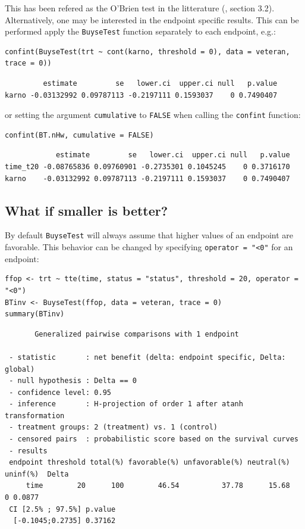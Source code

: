 \documentclass[12pt]{article}
\begin{document}
This has been refered as the O’Brien test in the litterature
(\cite{verbeeck2019generalized}, section 3.2). Alternatively, one may be
interested in the endpoint specific results. This can be performed
apply the \texttt{BuyseTest} function separately to each endpoint, e.g.:
\lstset{language=r,label= ,caption= ,captionpos=b,numbers=none}
\begin{lstlisting}
confint(BuyseTest(trt ~ cont(karno, threshold = 0), data = veteran, trace = 0))
\end{lstlisting}

\begin{verbatim}
         estimate         se   lower.ci  upper.ci null   p.value
karno -0.03132992 0.09787113 -0.2197111 0.1593037    0 0.7490407
\end{verbatim}


or setting the argument \texttt{cumulative} to \texttt{FALSE} when calling the
\texttt{confint} function:
\lstset{language=r,label= ,caption= ,captionpos=b,numbers=none}
\begin{lstlisting}
confint(BT.nHw, cumulative = FALSE)
\end{lstlisting}

\begin{verbatim}
            estimate         se   lower.ci  upper.ci null   p.value
time_t20 -0.08765836 0.09760901 -0.2735301 0.1045245    0 0.3716170
karno    -0.03132992 0.09787113 -0.2197111 0.1593037    0 0.7490407
\end{verbatim}


\clearpage

\subsection{What if smaller is better?}
\label{sec:org6e41682}
By default \texttt{BuyseTest} will always assume that higher values of an
endpoint are favorable. This behavior can be changed by specifying \texttt{operator = "<0"}
for an endpoint:
\lstset{language=r,label= ,caption= ,captionpos=b,numbers=none}
\begin{lstlisting}
ffop <- trt ~ tte(time, status = "status", threshold = 20, operator = "<0")
BTinv <- BuyseTest(ffop, data = veteran, trace = 0)
summary(BTinv)
\end{lstlisting}

\begin{verbatim}
       Generalized pairwise comparisons with 1 endpoint

 - statistic       : net benefit (delta: endpoint specific, Delta: global) 
 - null hypothesis : Delta == 0 
 - confidence level: 0.95 
 - inference       : H-projection of order 1 after atanh transformation 
 - treatment groups: 2 (treatment) vs. 1 (control) 
 - censored pairs  : probabilistic score based on the survival curves
 - results
 endpoint threshold total(%) favorable(%) unfavorable(%) neutral(%) uninf(%)  Delta
     time        20      100        46.54          37.78      15.68        0 0.0877
 CI [2.5% ; 97.5%] p.value 
  [-0.1045;0.2735] 0.37162
\end{verbatim}
\end{document}
